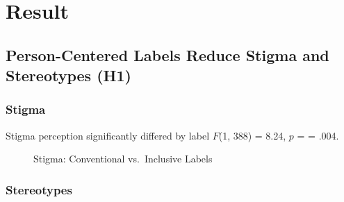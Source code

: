 \documentclass[
  man,
  floatsintext,
  longtable,
  nolmodern,
  notxfonts,
  notimes,
  colorlinks=true,linkcolor=blue,citecolor=blue,urlcolor=blue]{apa7}
\begin{document}
\section{Result}\label{result}

\subsection{Person-Centered Labels Reduce Stigma and Stereotypes
(H1)}\label{person-centered-labels-reduce-stigma-and-stereotypes-h1}

\subsubsection{Stigma}\label{stigma}

Stigma perception significantly differed by label \(F\)(1, 388) = 8.24,
\(p\) = = .004.

\begin{figure}

\caption{\label{fig-stigma-by-label}Stigma: Conventional vs.~Inclusive
Labels}


\end{figure}%

\subsubsection{Stereotypes}\label{stereotypes}
\end{document}
